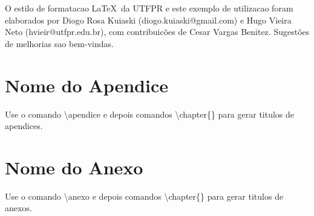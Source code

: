 \documentclass[openright]{normas-utf-tex} %
\begin{document}
O estilo de formatacao \LaTeX\ da UTFPR e este exemplo de utilizacao foram elaborados por Diogo Rosa Kuiaski (diogo.kuiaski@gmail.com) e Hugo Vieira Neto (hvieir@utfpr.edu.br), com contribuic\~oes de Cesar Vargas Benitez. Sugest\~oes de melhorias sao bem-vindas.


\clearpage %
\label{bibstart}
\label{bibend}

\apendice
\chapter{Nome do Apendice}

Use o comando {\ttfamily \textbackslash apendice} e depois comandos {\ttfamily \textbackslash chapter\{\}}
para gerar titulos de apendices.


\anexo
\chapter{Nome do Anexo}

Use o comando {\ttfamily \textbackslash anexo} e depois comandos {\ttfamily \textbackslash chapter\{\}}
para gerar titulos de anexos.


%
%
%
%
\end{document}
